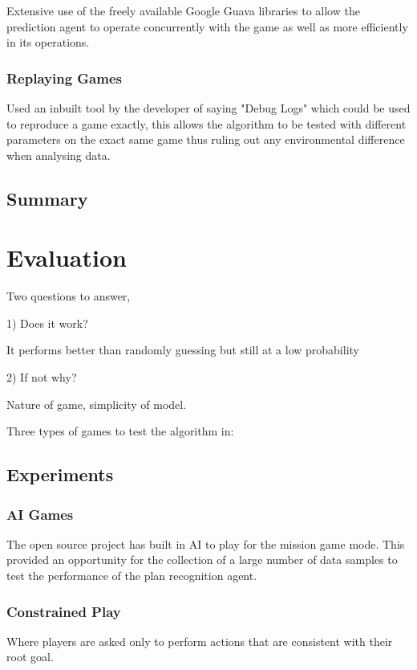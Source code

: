 \documentclass[parskip]{cs4rep}
\begin{document}
Extensive use of the freely available Google Guava libraries to allow the prediction agent to operate concurrently with the game as well as more efficiently in its operations.

\subsection{Replaying Games}

Used an inbuilt tool by the developer of saying "Debug Logs" which could be used to reproduce a game exactly, this allows the algorithm to be tested with different parameters on the exact same game thus ruling out any environmental difference when analysing data.

\section{Summary}

\chapter{Evaluation}

Two questions to answer, 

1) Does it work?

It performs better than randomly guessing but still at a low probability

2) If not why?

Nature of game, simplicity of model.

Three types of games to test the algorithm in:

\section{Experiments}

\subsection{AI Games}

The open source project has built in AI to play for the mission game mode. This provided an opportunity for the collection of a large number of data samples to test the performance of the plan recognition agent.

\subsection{Constrained Play}

Where players are asked only to perform actions that are consistent with their root goal.
\end{document}
